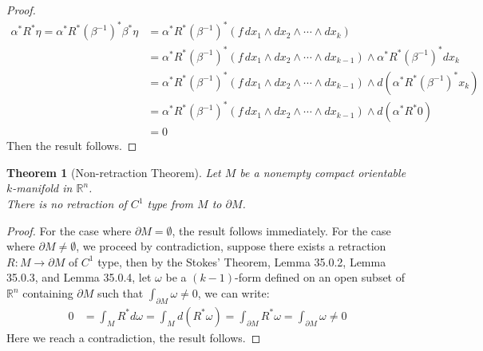 \documentclass[15pt]{book}
\theoremstyle{break}
\theoremstyle{break}
\newtheorem{thm}{Theorem}[section]
\newcommand{\R}{\mathbb{R}}
\begin{document}
\begin{proof}
\begin{align*}
\alpha^*R^*\eta = \alpha^*R^*(\beta^{-1})^*\beta^*\eta &= \alpha^*R^*(\beta^{-1})^*(f\, dx_1 \wedge dx_2 \wedge \cdots \wedge dx_k)\\
&= \alpha^*R^*(\beta^{-1})^*(f\, dx_1\wedge dx_2 \wedge \cdots \wedge dx_{k-1})\wedge \alpha^*R^*(\beta^{-1})^*dx_k\\
&= \alpha^*R^*(\beta^{-1})^*(f\, dx_1\wedge dx_2 \wedge \cdots \wedge dx_{k-1})\wedge d(\alpha^*R^*(\beta^{-1})^*x_k)\\
&= \alpha^*R^*(\beta^{-1})^*(f\, dx_1\wedge dx_2 \wedge \cdots \wedge dx_{k-1})\wedge d(\alpha^*R^*0)\\
&= 0
\end{align*}
Then the result follows.
\end{proof}


\begin{thm}[Non-retraction Theorem]
Let $M$ be a nonempty compact orientable $k$-manifold in $\R^n$. \\
There is no retraction of $C^1$ type from $M$ to $\partial M$. 
\end{thm}
\begin{proof}
For the case where $\partial M = \emptyset$, the result follows immediately. For the case where $\partial M \neq \emptyset$, we proceed by contradiction, suppose there exists a retraction $R:M \to \partial M$ of $C^1$ type, then by the Stokes' Theorem, Lemma 35.0.2, Lemma 35.0.3, and Lemma 35.0.4, let $\omega$ be a $(k-1)$-form defined on an open subset of $\R^n$ containing $\partial M$ such that $\int_{\partial M}\omega \neq 0$, we can write:
\begin{align*}
0 &= \int_M R^*d\omega = \int_M d(R^*\omega) = \int_{\partial M} R^*\omega = \int_{\partial M}\omega \neq 0
\end{align*}
Here we reach a contradiction, the result follows.
\end{proof}
\end{document}
